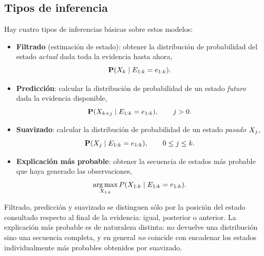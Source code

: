 \subsection{Tipos de inferencia}
\label{subsec:tipos_inferencia}

Hay cuatro tipos de inferencias b\'asicas sobre estos modelos:

\begin{itemize}
  \item \textbf{Filtrado} (estimaci\'on de estado): obtener la
    distribuci\'on de probabilidad del estado \emph{actual} dada toda la
    evidencia hasta ahora,
    \begin{equation}
      \label{eq:filtrado}
      \mathbf{P}(X_{k}\mid E_{1:k}=e_{1:k}).
    \end{equation}

  \item \textbf{Predicci\'on}: calcular la distribuci\'on de probabilidad de
    un estado \emph{futuro} dada la evidencia disponible,
    \begin{equation}
      \label{eq:prediccion}
      \mathbf{P}(X_{k+j}\mid E_{1:k}=e_{1:k}),\qquad j>0.
    \end{equation}

  \item \textbf{Suavizado}: calcular la distribuci\'on de probabilidad de un
    estado \emph{pasado} $X_{j}$,
    \begin{equation}
      \label{eq:suavizado}
      \mathbf{P}(X_{j}\mid E_{1:k}=e_{1:k}),\qquad 0\le j\le k.
    \end{equation}

  \item \textbf{Explicaci\'on m\'as probable}: obtener la secuencia de
    estados m\'as probable que haya generado las observaciones,
    \begin{equation}
      \label{eq:explicacion}
      \operatorname*{arg\,max}_{X_{1:k}} P(X_{1:k}\mid E_{1:k}=e_{1:k}).
    \end{equation}
\end{itemize}

\begin{observacion}
  Filtrado, predicci\'on y suavizado se distinguen s\'olo por la posici\'on
  del estado consultado respecto al final de la evidencia: igual, posterior o
  anterior. La explicaci\'on m\'as probable es de naturaleza distinta: no
  devuelve una distribuci\'on sino una secuencia completa, y en general
  \emph{no} coincide con encadenar los estados individualmente m\'as
  probables obtenidos por suavizado.
\end{observacion}

